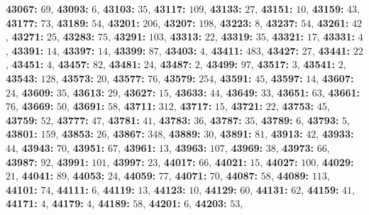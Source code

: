 \textsf{\bfseries 43067:} $69$, \textsf{\bfseries 43093:} $6$, \textsf{\bfseries 43103:} $35$, \textsf{\bfseries 43117:} $109$, \textsf{\bfseries 43133:} $27$, \textsf{\bfseries 43151:} $10$, \textsf{\bfseries 43159:} $43$, \textsf{\bfseries 43177:} $73$, \textsf{\bfseries 43189:} $54$, \textsf{\bfseries 43201:} $206$, \textsf{\bfseries 43207:} $198$, \textsf{\bfseries 43223:} $8$, \textsf{\bfseries 43237:} $54$, \textsf{\bfseries 43261:} $42$, \textsf{\bfseries 43271:} $25$, \textsf{\bfseries 43283:} $75$, \textsf{\bfseries 43291:} $103$, \textsf{\bfseries 43313:} $22$, \textsf{\bfseries 43319:} $35$, \textsf{\bfseries 43321:} $17$, \textsf{\bfseries 43331:} $4$, \textsf{\bfseries 43391:} $14$, \textsf{\bfseries 43397:} $14$, \textsf{\bfseries 43399:} $87$, \textsf{\bfseries 43403:} $4$, \textsf{\bfseries 43411:} $483$, \textsf{\bfseries 43427:} $27$, \textsf{\bfseries 43441:} $22$, \textsf{\bfseries 43451:} $4$, \textsf{\bfseries 43457:} $82$, \textsf{\bfseries 43481:} $24$, \textsf{\bfseries 43487:} $2$, \textsf{\bfseries 43499:} $97$, \textsf{\bfseries 43517:} $3$, \textsf{\bfseries 43541:} $2$, \textsf{\bfseries 43543:} $128$, \textsf{\bfseries 43573:} $20$, \textsf{\bfseries 43577:} $76$, \textsf{\bfseries 43579:} $254$, \textsf{\bfseries 43591:} $45$, \textsf{\bfseries 43597:} $14$, \textsf{\bfseries 43607:} $24$, \textsf{\bfseries 43609:} $35$, \textsf{\bfseries 43613:} $29$, \textsf{\bfseries 43627:} $15$, \textsf{\bfseries 43633:} $44$, \textsf{\bfseries 43649:} $33$, \textsf{\bfseries 43651:} $63$, \textsf{\bfseries 43661:} $76$, \textsf{\bfseries 43669:} $50$, \textsf{\bfseries 43691:} $58$, \textsf{\bfseries 43711:} $312$, \textsf{\bfseries 43717:} $15$, \textsf{\bfseries 43721:} $22$, \textsf{\bfseries 43753:} $45$, \textsf{\bfseries 43759:} $52$, \textsf{\bfseries 43777:} $47$, \textsf{\bfseries 43781:} $41$, \textsf{\bfseries 43783:} $36$, \textsf{\bfseries 43787:} $35$, \textsf{\bfseries 43789:} $6$, \textsf{\bfseries 43793:} $5$, \textsf{\bfseries 43801:} $159$, \textsf{\bfseries 43853:} $26$, \textsf{\bfseries 43867:} $348$, \textsf{\bfseries 43889:} $30$, \textsf{\bfseries 43891:} $81$, \textsf{\bfseries 43913:} $42$, \textsf{\bfseries 43933:} $44$, \textsf{\bfseries 43943:} $70$, \textsf{\bfseries 43951:} $67$, \textsf{\bfseries 43961:} $13$, \textsf{\bfseries 43963:} $107$, \textsf{\bfseries 43969:} $38$, \textsf{\bfseries 43973:} $66$, \textsf{\bfseries 43987:} $92$, \textsf{\bfseries 43991:} $101$, \textsf{\bfseries 43997:} $23$, \textsf{\bfseries 44017:} $66$, \textsf{\bfseries 44021:} $15$, \textsf{\bfseries 44027:} $100$, \textsf{\bfseries 44029:} $21$, \textsf{\bfseries 44041:} $89$, \textsf{\bfseries 44053:} $24$, \textsf{\bfseries 44059:} $77$, \textsf{\bfseries 44071:} $70$, \textsf{\bfseries 44087:} $58$, \textsf{\bfseries 44089:} $113$, \textsf{\bfseries 44101:} $74$, \textsf{\bfseries 44111:} $6$, \textsf{\bfseries 44119:} $13$, \textsf{\bfseries 44123:} $10$, \textsf{\bfseries 44129:} $60$, \textsf{\bfseries 44131:} $62$, \textsf{\bfseries 44159:} $41$, \textsf{\bfseries 44171:} $4$, \textsf{\bfseries 44179:} $4$, \textsf{\bfseries 44189:} $58$, \textsf{\bfseries 44201:} $6$, \textsf{\bfseries 44203:} $53$, 
